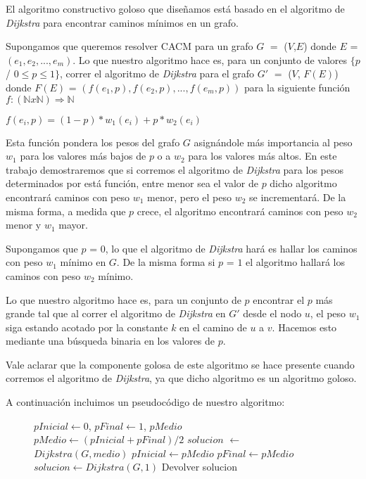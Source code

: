 El algoritmo constructivo goloso que diseñamos está basado en el algoritmo de \emph{Dijkstra} para encontrar caminos mínimos en un grafo. 

Supongamos que queremos resolver CACM para un grafo $G$ $=$ ($V$,$E$) donde $E$ = $(e_1, e_2, ..., e_m)$. Lo que nuestro algoritmo hace es, para un conjunto de valores $\{p$ / $0 \leq p \leq 1\}$, correr el algoritmo de \emph{Dijkstra} para el grafo $G'$ $=$ ($V$, $F(E)$) donde $F(E)$ = $(f(e_1,p), f(e_2,p), ...,f(e_m,p))$ para la siguiente función $f: (\mathbb{N} x \mathbb{N}) \Rightarrow \mathbb{N}$

$f(e_i,p) = (1-p)*w_1(e_i) + p*w_2(e_i)$

Esta función pondera los pesos del grafo $G$ asignándole más importancia al peso $w_1$ para los valores más bajos de $p$ o a $w_2$ para los valores más altos. En este trabajo demostraremos que si corremos el algoritmo de \emph{Dijkstra} para los pesos determinados por está función, entre menor sea el valor de $p$ dicho algoritmo encontrará caminos con peso $w_1$ menor, pero el peso $w_2$ se incrementará. De la misma forma, a medida que $p$ crece, el algoritmo encontrará caminos con peso $w_2$ menor y $w_1$ mayor.

Supongamos que $p$ = $0$, lo que el algoritmo de \emph{Dijkstra} hará es hallar los caminos con peso $w_1$ mínimo en $G$. De la misma forma si $p$ = $1$ el algoritmo hallará los caminos con peso $w_2$ mínimo.

Lo que nuestro algoritmo hace es, para un conjunto de $p$ encontrar el $p$ más grande tal que al correr el algoritmo de \emph{Dijkstra} en $G'$ desde el nodo $u$, el peso $w_1$ siga estando acotado por la constante $k$ en el camino de $u$ a $v$. Hacemos esto mediante una búsqueda binaria en los valores de $p$.

Vale aclarar que la componente golosa de este algoritmo se hace presente cuando corremos el algoritmo de \emph{Dijkstra}, ya que dicho algoritmo es un algoritmo goloso.

A continuación incluimos un pseudocódigo de nuestro algoritmo:

\begin{center}
 \begin{figure}[H]
  \begin{pseudo}
    \State $pInicial \leftarrow 0$, $pFinal \leftarrow 1$, $pMedio$
      \State $pMedio \leftarrow (pInicial + pFinal)/2$
      \State $solucion$ $\leftarrow$ $Dijkstra(G, medio)$
	 \State $pInicial \leftarrow pMedio$
      \Else
	 \State $pFinal \leftarrow pMedio$
      \EndIf
    \EndFor
      \State $solucion \leftarrow Dijkstra(G, 1)$
    \EndIf
    \State Devolver solucion
   \EndProcedure
  \end{pseudo}
 \end{figure}
\end{center}